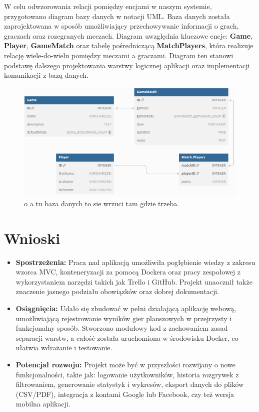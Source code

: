 \documentclass[12pt,a4paper]{article}
\begin{document}
\begin{enumerate}
W celu odwzorowania relacji pomiędzy encjami w naszym systemie, przygotowano diagram bazy danych w notacji UML. Baza danych została zaprojektowana w sposób umożliwiający przechowywanie informacji o grach, graczach oraz rozegranych meczach. Diagram uwzględnia kluczowe encje: \textbf{Game}, \textbf{Player}, \textbf{GameMatch} oraz tabelę pośredniczącą \textbf{MatchPlayers}, która realizuje relację wiele-do-wielu pomiędzy meczami a graczami. Diagram ten stanowi podstawę dalszego projektowania warstwy logicznej aplikacji oraz implementacji komunikacji z bazą danych.

\begin{figure}[H]
	\centering
	\includegraphics[width=1\linewidth]{media/baza_danych}
	\caption{o a tu baza danych to sie wrzuci tam gdzie trzeba.}
	\label{fig:bazadanych}
\end{figure}


\section{Wnioski}
\begin{itemize}
	\item \textbf{Spostrzeżenia:} Praca nad aplikacją umożliwiła pogłębienie wiedzy z zakresu wzorca MVC, konteneryzacji za pomocą Dockera oraz pracy zespołowej z wykorzystaniem narzędzi takich jak Trello i GitHub. Projekt unaocznił także znaczenie jasnego podziału obowiązków oraz dobrej dokumentacji.
	\item \textbf{Osiągnięcia:} Udało się zbudować w pełni działającą aplikację webową, umożliwiającą rejestrowanie wyników gier planszowych w przejrzysty i funkcjonalny sposób. Stworzono modułowy kod z zachowaniem zasad separacji warstw, a całość została uruchomiona w środowisku Docker, co ułatwia wdrażanie i testowanie.
	\item \textbf{Potencjał rozwoju:} Projekt może być w przyszłości rozwijany o nowe funkcjonalności, takie jak: logowanie użytkowników, historia rozgrywek z filtrowaniem, generowanie statystyk i wykresów, eksport danych do plików (CSV/PDF), integracja z kontami Google lub Facebook, czy też wersja mobilna aplikacji.
\end{itemize}


\end{enumerate}
\end{document}
